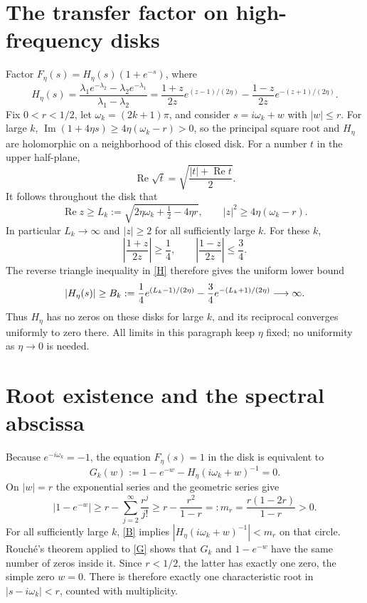 \documentclass[11pt]{article}
\newcommand{\Ree}{\operatorname{Re}}
\newcommand{\Imm}{\operatorname{Im}}
\begin{document}
\section*{The transfer factor on high-frequency disks}
Factor $F_\eta(s)=H_\eta(s)(1+e^{-s})$, where
\begin{equation}\label{H}
 H_\eta(s)=\frac{\lambda_1 e^{-\lambda_2}-\lambda_2e^{-\lambda_1}}
                  {\lambda_1-\lambda_2}
 =\frac{1+z}{2z}e^{(z-1)/(2\eta)}
   -\frac{1-z}{2z}e^{-(z+1)/(2\eta)}.
\end{equation}
Fix $0<r<1/2$, let $\omega_k=(2k+1)\pi$, and consider
$s=i\omega_k+w$ with $|w|\leq r$. For large $k$,
$\Imm(1+4\eta s)\geq4\eta(\omega_k-r)>0$, so the principal square
root and $H_\eta$ are holomorphic on a neighborhood of this closed disk.
For a number $t$ in the upper half-plane,
\[
 \Ree\sqrt t=\sqrt{\frac{|t|+\Ree t}{2}}.
\]
It follows throughout the disk that
\begin{equation}\label{zbound}
 \Ree z\geq L_k:=\sqrt{2\eta\omega_k+\tfrac12-4\eta r},
 \qquad |z|^2\geq4\eta(\omega_k-r).
\end{equation}
In particular $L_k\to\infty$ and $|z|\geq2$ for all sufficiently large
$k$. For these $k$,
\[
 \left|\frac{1+z}{2z}\right|\geq\frac14,
 \qquad \left|\frac{1-z}{2z}\right|\leq\frac34.
\]
The reverse triangle inequality in \eqref{H} therefore gives the uniform
lower bound
\begin{equation}\label{B}
 |H_\eta(s)|\geq B_k:={1\over4}e^{(L_k-1)/(2\eta)}
                         -{3\over4}e^{-(L_k+1)/(2\eta)}
 \longrightarrow\infty.
\end{equation}
Thus $H_\eta$ has no zeros on these disks for large $k$, and its reciprocal
converges uniformly to zero there. All limits in this paragraph keep
$\eta$ fixed; no uniformity as $\eta\to0$ is needed.

\section*{Root existence and the spectral abscissa}
Because $e^{-i\omega_k}=-1$, the equation $F_\eta(s)=1$ in the disk is
equivalent to
\begin{equation}\label{G}
 G_k(w):=1-e^{-w}-H_\eta(i\omega_k+w)^{-1}=0.
\end{equation}
On $|w|=r$ the exponential series and the geometric series give
\begin{equation}\label{m}
 |1-e^{-w}|\geq r-\sum_{j=2}^{\infty}\frac{r^j}{j!}
 \geq r-\frac{r^2}{1-r}
 =:m_r=\frac{r(1-2r)}{1-r}>0.
\end{equation}
For all sufficiently large $k$, \eqref{B} implies
$|H_\eta(i\omega_k+w)^{-1}|<m_r$ on that circle.
Rouch\'e's theorem applied to \eqref{G} shows that $G_k$ and
$1-e^{-w}$ have the same number of zeros inside it. Since $r<1/2$,
the latter has exactly one zero, the simple zero $w=0$.
There is therefore exactly one characteristic root in
$|s-i\omega_k|<r$, counted with multiplicity.
\end{document}
